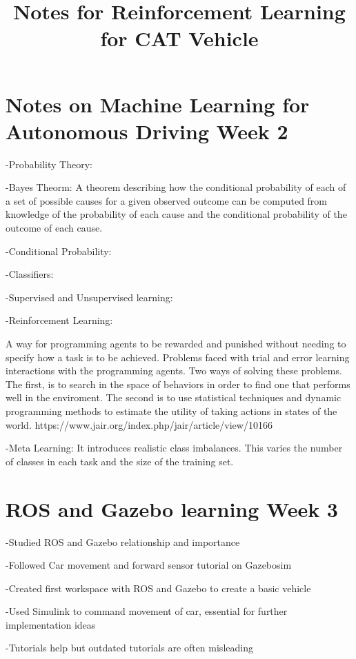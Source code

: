 \documentclass[12pt]{article}
\begin{document}
\title{Notes for Reinforcement Learning for CAT Vehicle}
\maketitle

\section{Notes on Machine Learning for Autonomous Driving Week 2}
-Probability Theory:


-Bayes Theorm: A theorem describing how the conditional probability of each of a set of possible causes for a given observed outcome can be computed from knowledge of the probability of each cause and the conditional probability of the outcome of each cause.

-Conditional Probability:

-Classifiers:

-Supervised and Unsupervised learning:

-Reinforcement Learning:

A way for programming agents to be rewarded and punished without needing to specify how a task is to be achieved. Problems faced with trial and error learning interactions with the programming agents. Two ways of solving these problems. The first, is to search in the space of behaviors in order to find one that performs well in the enviroment. The second is to use statistical techniques and dynamic programming methods to estimate the utility of taking actions in states of the world. https://www.jair.org/index.php/jair/article/view/10166

-Meta Learning: It introduces realistic class imbalances. This varies the number of classes in each task and the size of the training set.

\section{ROS and Gazebo learning Week 3}
-Studied ROS and Gazebo relationship and importance

-Followed Car movement and forward sensor tutorial on Gazebosim

-Created first workspace with ROS and Gazebo to create a basic vehicle

-Used Simulink to command movement of car, essential for further implementation ideas

-Tutorials help but outdated tutorials are often misleading
\end{document}
